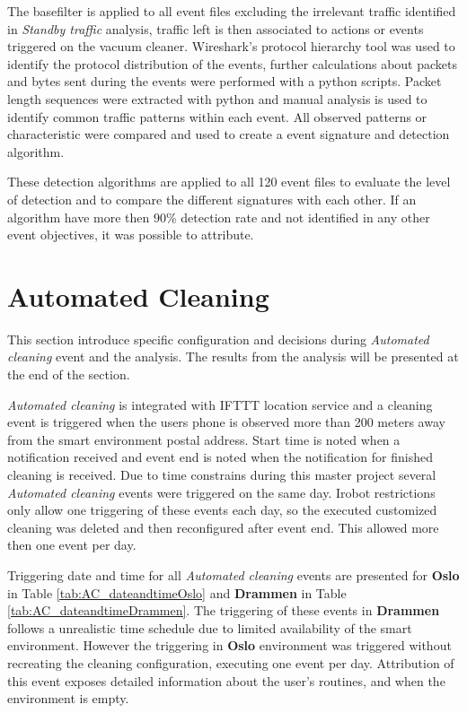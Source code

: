  The basefilter is applied to all event files excluding the irrelevant traffic identified in \textit{Standby traffic} analysis, traffic left is then associated to actions or events triggered on the vacuum cleaner. Wireshark's protocol hierarchy tool was used to identify the protocol distribution of the events, further calculations about packets and bytes sent during the events were performed with a python scripts. Packet length sequences were extracted with python and manual analysis is used to identify common traffic patterns within each event. All observed patterns or characteristic were compared and used to create a event signature and detection algorithm. 

 These detection algorithms are applied to all 120 event files to evaluate the level of detection and to compare the different signatures with each other. If an algorithm have more then 90\% detection rate and not identified in any other event objectives, it was possible to attribute.

 \section{Automated Cleaning}

This section introduce specific configuration and decisions during \textit{Automated cleaning} event and the analysis. The results from the analysis will be presented at the end of the section. 
 
\textit{Automated cleaning} is integrated with IFTTT location service and a cleaning event is triggered when the users phone is observed more than 200 meters away from the smart environment postal address. Start time is noted when a notification received and event end is noted when the notification for finished cleaning is received. Due to time constrains during this master project several \textit{Automated cleaning} events were triggered on the same day. Irobot restrictions only allow one triggering of these events each day, so the executed customized cleaning was deleted and then reconfigured after event end. This allowed more then one event per day.

Triggering date and time for all \textit{Automated cleaning} events are presented for \textbf{Oslo} in Table \ref{tab:AC_dateandtimeOslo} and \textbf{Drammen} in Table \ref{tab:AC_dateandtimeDrammen}. The triggering of these events in \textbf{Drammen} follows a unrealistic time schedule due to limited availability of the smart environment. However the triggering in \textbf{Oslo} environment was triggered without recreating the cleaning configuration, executing one event per day. Attribution of this event exposes detailed information about the user's routines, and when the environment is empty. 

